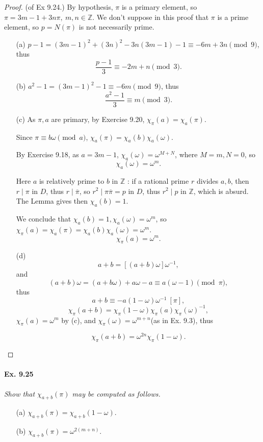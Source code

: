 \documentclass[11pt,a4paper]{article}
\newcommand{\Z}{\mathbb{Z}}
\begin{document}
\begin{proof}(of Ex 9.24.)
By hypothesis, $\pi$ is a primary element, so $\pi = 3m-1 + 3n \pi,\ m,n\in \Z$.
We don't suppose in this proof that $\pi$ is a prime element, so $p = N(\pi)$ is not necessarily prime. 
 \begin{enumerate}
\item[(a)]$p-1 = (3m-1)^2+(3n)^2-3n(3m-1) - 1 \equiv -6m + 3n \pmod 9$, thus $$\frac{p-1}{3} \equiv -2m + n \pmod 3.$$
\item[(b)]$a^2 - 1 = (3m-1)^2-1 \equiv -6m \pmod 9$, thus
$$\frac{a^2-1}{3} \equiv m \pmod 3.$$
\item[(c)]  
 As $\pi,a$ are primary, by Exercise 9.20, $\chi_\pi(a) = \chi_a(\pi)$.

Since $\pi \equiv b\omega \pmod a$, $\chi_a(\pi) = \chi_a(b) \chi_a(\omega)$.

By Exercise 9.18,  as $a = 3m-1$, $\chi_a(\omega) = \omega^{M+N}$, where $M = m, N = 0$, so $$\chi_a(\omega) = \omega^m.$$

Here $a$ is relatively prime to $b$ in $\Z$ : if a rational prime $r$ divides $a,b$, then $r \mid \pi$ in $D$, thus $r \mid \overline{\pi}$, so $r^2 \mid \pi \overline{\pi} = p$ in $D$, thus $r^2 \mid p$ in $\Z$, which is absurd. The Lemma gives then $\chi_a(b) = 1$.

 We conclude that $\chi_a(b) = 1,\chi_a(\omega) = \omega^m$, so $\chi_\pi(a) = \chi_a(\pi) = \chi_a(b) \chi_a(\omega) = \omega^m$.
 $$\chi_\pi(a) = \omega^m.$$
 
 \item[(d)] 
 $$a+b = [(a+b) \omega] \omega^{-1},$$
and 
$$(a+b) \omega = (a+b\omega) +a\omega -a \equiv a(\omega-1)\pmod \pi,$$ thus
$$a+b \equiv -a(1-\omega) \omega^{-1} \ [\pi],$$
$$\chi_\pi (a+b) = \chi_\pi(1-\omega) \chi_\pi(a) \chi_\pi(\omega)^{-1},$$
$\chi_\pi(a) = \omega^m$ by (c), and $\chi_\pi(\omega) = \omega^{m+n}$(as in Ex. 9.3), thus

$$\chi_\pi(a+b) = \omega^{2n} \chi_\pi(1-\omega).$$

\end{enumerate}
\end{proof}

\paragraph{Ex. 9.25}

{\it Show that $\chi_{a+b}(\pi)$ may be computed as follows.
\begin{enumerate}
\item[(a)] $\chi_{a+b}(\pi) = \chi_{a+b}(1-\omega)$.
\item[(b)] $\chi_{a+b}(\pi) = \omega^{2(m+n)}$.
\end{enumerate}
}
\end{document}
